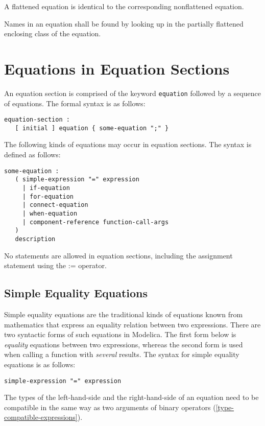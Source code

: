 A flattened equation is identical to the corresponding nonflattened equation.

Names in an equation shall be found by looking up in the partially flattened enclosing class of the equation.

\section{Equations in Equation Sections}\label{equations-in-equation-sections}

An equation section is comprised of the keyword \lstinline!equation! followed by a sequence of equations.
The formal syntax is as follows:
\begin{lstlisting}[language=grammar]
equation-section :
   [ initial ] equation { some-equation ";" }
\end{lstlisting}

The following kinds of equations may occur in equation sections.
The syntax is defined as follows:
\begin{lstlisting}[language=grammar]
some-equation :
   ( simple-expression "=" expression
     | if-equation
     | for-equation
     | connect-equation
     | when-equation
     | component-reference function-call-args
   )
   description
\end{lstlisting}
No statements are allowed in equation sections, including the assignment statement using the := operator.

\subsection{Simple Equality Equations}\label{simple-equality-equations}

Simple equality equations are the traditional kinds of equations known from mathematics that express an equality relation between two expressions.
There are two syntactic forms of such equations in Modelica.
The first form below is \emph{equality} equations between two expressions, whereas the second form is used when calling a function with \emph{several} results.
The syntax for simple equality equations is as follows:
\begin{lstlisting}[language=grammar]
simple-expression "=" expression
\end{lstlisting}
The types of the left-hand-side and the right-hand-side of an equation need to be compatible in the same way as two arguments of binary operators (\cref{type-compatible-expressions}).

